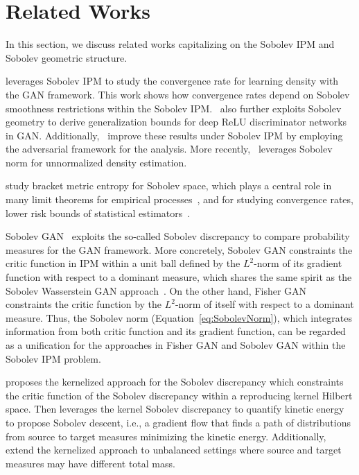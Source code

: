 \section{Related Works}
\label{sec:related_works}

In this section, we discuss related works capitalizing  on the Sobolev IPM and Sobolev geometric structure.

\citet{liang2017well_arXiv} leverages Sobolev IPM to study the convergence rate for learning density with the GAN framework. This work shows how convergence rates depend on Sobolev smoothness restrictions within the Sobolev IPM.~\citet{liang2017well_arXiv} also further exploits Sobolev geometry to derive generalization bounds for deep ReLU discriminator networks in GAN. Additionally,~\citet{singh2018nonparametric, liang2021well_jmlr} improve these results under Sobolev IPM by employing the adversarial framework for the analysis. More recently,~\citet{kozdobasobolev} leverages Sobolev norm for unnormalized density estimation.



\citet{nickl2007bracketing} study bracket metric entropy for Sobolev space, which plays a central role in many limit theorems for empirical processes~\citep{dudley1978central, ossiander1987central, andersen1988central}, and for studying convergence rates, lower risk bounds of statistical estimators~\citep{birge1993rates, geer2000empirical}.

Sobolev GAN~\citep{Mroueh-2018-Sobolev} exploits the so-called Sobolev discrepancy to compare probability measures for the GAN framework. More concretely, Sobolev GAN constraints the critic function in IPM within a unit ball defined by the $L^2$-norm of its gradient function with respect to a dominant measure, which shares the same spirit as the Sobolev Wasserstein GAN approach~\citep{xu2020towards}. On the other hand, Fisher GAN~\citep{mroueh2017fisher} constraints the critic function by the $L^2$-norm of itself with respect to a dominant measure. Thus, the Sobolev norm (Equation~\eqref{eq:SobolevNorm}), which integrates information from both critic function and its gradient function, can be regarded as a unification for the approaches in Fisher GAN and Sobolev GAN within the Sobolev IPM problem.

\citet{mroueh2018regularized} proposes the kernelized approach for the Sobolev discrepancy which constraints the critic function of the Sobolev discrepancy within a reproducing kernel Hilbert space. Then \citet{mroueh2019sobolev} leverages the kernel Sobolev discrepancy to quantify kinetic energy to propose Sobolev descent, i.e., a gradient flow that finds a path of distributions from source to target measures minimizing the kinetic energy. Additionally,~\citet{mroueh2020unbalanced} extend the kernelized approach to unbalanced settings where source and target measures may have different total mass.

